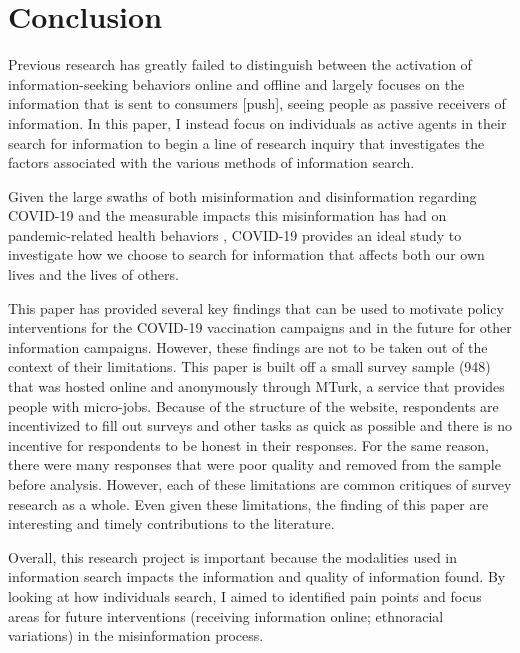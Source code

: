 \hypertarget{conclusion}{%
\section{Conclusion}\label{conclusion}}

Previous research has greatly failed to distinguish between the activation of
information-seeking behaviors online and offline and largely focuses on the
information that is sent to consumers [push], seeing people as passive receivers
of information. In this paper, I instead focus on individuals as active agents
in their search for information to begin a line of research inquiry that
investigates the factors associated with the various methods of information
search.

Given the large swaths of both misinformation and disinformation regarding
COVID-19 \citep{pathakInfodemicsCOVID19Role2020, mottaHowRightLeaningMedia2020, shahsavariConspiracyTimeCorona2020} 
and the measurable impacts this misinformation has had on pandemic-related health behaviors
\citep{loombaMeasuringImpactCOVID192021, greene_murphy21}, COVID-19 provides an ideal study to
investigate how we choose to search for information that affects both our own
lives and the lives of others.

This paper has provided several key findings that can be used to motivate policy
interventions for the COVID-19 vaccination campaigns and in the future for other
information campaigns. However, these findings are not to be taken out of the
context of their limitations. This paper is built off a small survey sample (948)
that was hosted online and anonymously through MTurk, a service
that provides people with micro-jobs. Because of the structure of the website,
respondents are incentivized to fill out surveys and other tasks 
as quick as possible and there is no incentive for respondents to be honest
in their responses. For the same reason, there were many responses that 
were poor quality and removed from the sample before analysis.
However, each of these limitations are common critiques of 
survey research as a whole. Even given these limitations,
the finding of this paper are interesting and timely contributions to the literature.

Overall, this research project is important because the modalities used in
information search impacts the information and quality of information found. By
looking at how individuals search, I aimed to identified pain points and focus areas
for future interventions (receiving information online; ethnoracial variations) 
in the misinformation process.